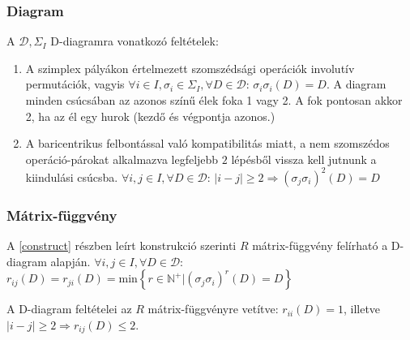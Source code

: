 \documentclass[12pt,magyar,a4paper]{article}
\begin{document}
\subsubsection{Diagram}
A $\mathcal{D}, \Sigma_I$ D-diagramra vonatkozó feltételek:
\begin{enumerate}
  \item A szimplex pályákon értelmezett szomszédsági operációk involutív
    permutációk, vagyis $\forall i\in I, \sigma_i\in \Sigma_I, \forall D\in
    \mathcal{D}$: $\sigma_i\sigma_i(D)=D$. A diagram minden csúcsában az azonos
    színű élek foka 1 vagy 2. A fok pontosan akkor 2, ha az él egy hurok (kezdő
    és végpontja azonos.)
  \item A baricentrikus felbontással való kompatibilitás miatt, a nem szomszédos
    operáció-párokat alkalmazva legfeljebb $2$ lépésből vissza kell jutnunk a
    kiindulási csúcsba. $\forall i,j\in I, \forall D\in \mathcal{D}$: $|i-j|\geq
    2 \Rightarrow (\sigma_j\sigma_i)^2(D)=D$
\end{enumerate}

\subsubsection{Mátrix-függvény}
A \ref{construct} részben leírt konstrukció szerinti $R$ mátrix-függvény
felírható a D-diagram alapján. $\forall i,j\in I, \forall D\in \mathcal{D}$:
$r_{ij}(D)=r_{ji}(D)=\mathrm{min}\left\{r\in
\mathbb{N}^+|(\sigma_j\sigma_i)^r(D)=D\right\}$

A D-diagram feltételei az $R$ mátrix-függvényre vetítve: $r_{ii}(D)=1$,
illetve $|i-j|\geq 2 \Rightarrow r_{ij}(D)\leq2$.
\end{document}
